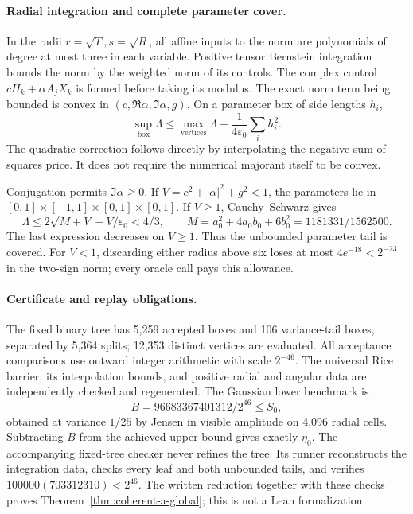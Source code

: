\paragraph{Radial integration and complete parameter cover.}
In the radii $r=\sqrt T,s=\sqrt R$, all affine inputs to the norm are
polynomials of degree at most three in each variable. Positive tensor
Bernstein integration bounds the norm by the weighted norm of its
controls. The complex control $cH_k+\alpha A_jX_k$ is formed before
taking its modulus. The exact norm term being bounded is convex in
$(c,\Re\alpha,\Im\alpha,g)$. On a parameter box of side lengths $h_i$,
\[
 \sup_{\text{box}}\Lambda
 \le\max_{\text{vertices}}\Lambda
          +\frac1{4\varepsilon_0}\sum_i h_i^2.
\]
The quadratic correction follows directly by interpolating the
negative sum-of-squares price. It does not require the numerical
majorant itself to be convex.

Conjugation permits $\Im\alpha\ge0$. If $V=c^2+|\alpha|^2+g^2<1$,
the parameters lie in $[0,1]\times[-1,1]\times[0,1]\times[0,1]$.
If $V\ge1$, Cauchy--Schwarz gives
\[
 \Lambda\le 2\sqrt{M+V}-V/\varepsilon_0<4/3,
 \qquad M=a_0^2+4a_0b_0+6b_0^2=1181331/1562500.
\]
The last expression decreases on $V\ge1$. Thus the unbounded parameter
tail is covered. For $V<1$, discarding either radius above six loses
at most $4e^{-18}<2^{-23}$ in the two-sign norm; every oracle call
pays this allowance.

\paragraph{Certificate and replay obligations.}
The fixed binary tree has 5,259 accepted boxes and 106 variance-tail
boxes, separated by 5,364 splits; 12,353 distinct vertices are evaluated.
All acceptance comparisons use outward integer arithmetic with scale
$2^{-46}$. The universal Rice barrier, its interpolation bounds, and
positive radial and angular data are independently checked and regenerated.
The Gaussian lower benchmark is
\[
 B=96683367401312/2^{46}\le S_0,
\]
obtained at variance $1/25$ by Jensen in visible amplitude on 4,096
radial cells. Subtracting $B$ from the achieved upper bound gives
exactly $\eta_0$. The accompanying fixed-tree checker never refines the
tree. Its runner reconstructs the integration data, checks every leaf
and both unbounded tails, and verifies $100000(703312310)<2^{46}$.
The written reduction together with these checks proves
Theorem~\ref{thm:coherent-a-global}; this is not a Lean formalization.

